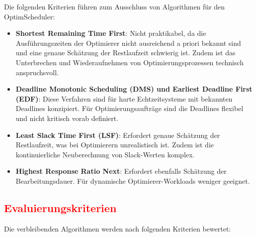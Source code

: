 Die folgenden Kriterien führen zum Ausschluss von Algorithmen für den OptimScheduler:

\begin{itemize}
    \item \textbf{Shortest Remaining Time First}: Nicht praktikabel, da die Ausführungszeiten der Optimierer nicht ausreichend a priori bekannt sind und eine genaue Schätzung der Restlaufzeit schwierig ist. Zudem ist das Unterbrechen und Wiederaufnehmen von Optimierungsprozessen technisch anspruchsvoll.
    
    \item \textbf{Deadline Monotonic Scheduling (DMS) und Earliest Deadline First (EDF)}: Diese Verfahren sind für harte Echtzeitsysteme mit bekannten Deadlines konzipiert. Für Optimierungsaufträge sind die Deadlines flexibel und nicht kritisch vorab definiert.
    
    \item \textbf{Least Slack Time First (LSF)}: Erfordert genaue Schätzung der Restlaufzeit, was bei Optimierern unrealistisch ist. Zudem ist die kontinuierliche Neuberechnung von Slack-Werten komplex.
    
    \item \textbf{Highest Response Ratio Next}: Erfordert ebenfalls Schätzung der Bearbeitungsdauer. Für dynamische Optimierer-Workloads weniger geeignet.
\end{itemize}

\subsection{\textcolor{red}{Evaluierungskriterien}}

Die verbleibenden Algorithmen werden nach folgenden Kriterien bewertet:

